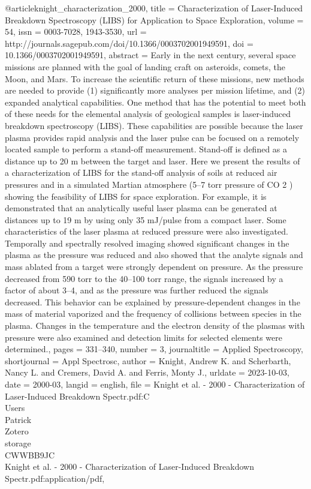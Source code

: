 @article{knight_characterization_2000,
	title = {Characterization of Laser-Induced Breakdown Spectroscopy ({LIBS}) for Application to Space Exploration},
	volume = {54},
	issn = {0003-7028, 1943-3530},
	url = {http://journals.sagepub.com/doi/10.1366/0003702001949591},
	doi = {10.1366/0003702001949591},
	abstract = {Early in the next century, several space missions are planned with the goal of landing craft on asteroids, comets, the Moon, and Mars. To increase the scientific return of these missions, new methods are needed to provide (1) significantly more analyses per mission lifetime, and (2) expanded analytical capabilities. One method that has the potential to meet both of these needs for the elemental analysis of geological samples is laser-induced breakdown spectroscopy ({LIBS}). These capabilities are possible because the laser plasma provides rapid analysis and the laser pulse can be focused on a remotely located sample to perform a stand-off measurement. Stand-off is defined as a distance up to 20 m between the target and laser. Here we present the results of a characterization of {LIBS} for the stand-off analysis of soils at reduced air pressures and in a simulated Martian atmosphere (5–7 torr pressure of {CO}
              2
              ) showing the feasibility of {LIBS} for space exploration. For example, it is demonstrated that an analytically useful laser plasma can be generated at distances up to 19 m by using only 35 {mJ}/pulse from a compact laser. Some characteristics of the laser plasma at reduced pressure were also investigated. Temporally and spectrally resolved imaging showed significant changes in the plasma as the pressure was reduced and also showed that the analyte signals and mass ablated from a target were strongly dependent on pressure. As the pressure decreased from 590 torr to the 40–100 torr range, the signals increased by a factor of about 3–4, and as the pressure was further reduced the signals decreased. This behavior can be explained by pressure-dependent changes in the mass of material vaporized and the frequency of collisions between species in the plasma. Changes in the temperature and the electron density of the plasmas with pressure were also examined and detection limits for selected elements were determined.},
	pages = {331--340},
	number = {3},
	journaltitle = {Applied Spectroscopy},
	shortjournal = {Appl Spectrosc},
	author = {Knight, Andrew K. and Scherbarth, Nancy L. and Cremers, David A. and Ferris, Monty J.},
	urldate = {2023-10-03},
	date = {2000-03},
	langid = {english},
	file = {Knight et al. - 2000 - Characterization of Laser-Induced Breakdown Spectr.pdf:C\:\\Users\\Patrick\\Zotero\\storage\\CWWBB9JC\\Knight et al. - 2000 - Characterization of Laser-Induced Breakdown Spectr.pdf:application/pdf},
}
